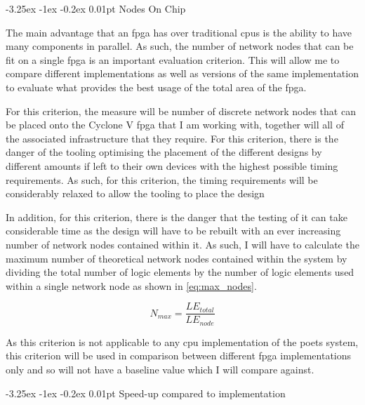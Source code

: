 \documentclass[paper=a4, fontsize=11pt, bibliography=totocnumbered]{scrartcl}
\makeatletter
\renewcommand\paragraph{\@startsection{paragraph}{4}{\z@}%
  {-3.25ex \@plus -1ex \@minus -0.2ex}%
  {0.01pt}%
  {\raggedsection\normalfont\sectfont\nobreak\size@paragraph}%
}
\numberwithin{equation}{section}		%
\numberwithin{figure}{section}			%
\numberwithin{table}{section}				%
\makeatother
\begin{document}
\paragraph{Nodes On Chip}

The main advantage that an \gls{fpga} has over traditional \glspl{cpu} is the ability to have many components in parallel. As such, the number of \glspl{network node} that can be fit on a single \gls{fpga} is an important evaluation criterion. This will allow me to compare different implementations as well as versions of the same implementation to evaluate what provides the best usage of the total area of the \gls{fpga}.

For this criterion, the measure will be number of discrete \glspl{network node} that can be placed onto the Cyclone V \gls{fpga} that I am working with, together will all of the associated infrastructure that they require. For this criterion, there is the danger of the tooling optimising the placement of the different designs by different amounts if left to their own devices with the highest possible timing requirements. As such, for this criterion, the timing requirements will be considerably relaxed to allow the tooling to place the design 

In addition, for this criterion, there is the danger that the testing of it can take considerable time as the design will have to be rebuilt with an ever increasing number of \glspl{network node} contained within it. As such, I will have to calculate the maximum number of theoretical \glspl{network node} contained within the system by dividing the total number of \glspl{logic element} by the number of \glspl{logic element} used within a single \gls{network node} as shown in \cref{eq:max_nodes}.

\begin{equation}\label{eq:max_nodes}
N_{max} = \frac{LE_{total}}{LE_{node}}
\end{equation}


As this criterion is not applicable to any \gls{cpu} implementation of the \gls{poets} system, this criterion will be used in comparison between different \gls{fpga} implementations only and so will not have a baseline value which I will compare against.

\paragraph{Speed-up compared to  implementation}
\end{document}
